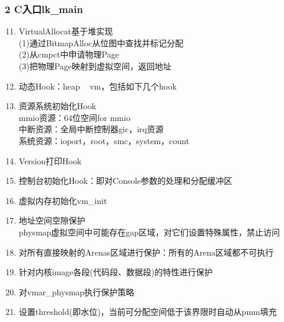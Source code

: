 \documentclass[
8pt, %
]{beamer}
\begin{document}
	\begin{frame}
		\frametitle{2 C入口lk\_main}
		\begin{enumerate}\setcounter{enumi}{10}
			\item VirtualAllocat基于堆实现\\
			(1)通过BitmapAlloc从位图中查找并标记分配\\
			(2)从cmpct中申请物理Page\\
			(3)把物理Page映射到虚拟空间，返回地址
			\item 动态Hook：heap ~ vm，包括如下几个hook
			\item 资源系统初始化Hook\\
			mmio资源：64位空间for mmio\\
			中断资源：全局中断控制器gic，irq资源\\
			系统资源：ioport，root，smc，system，count
			\item Version打印Hook
			\item 控制台初始化Hook：即对Console参数的处理和分配缓冲区
			\item 虚拟内存初始化vm\_init
			\item 地址空间空隙保护\\
			physmap虚拟空间中可能存在gap区域，对它们设置特殊属性，禁止访问
			\item 对所有直接映射的Arenas区域进行保护：所有的Arena区域都不可执行
			\item 针对内核image各段(代码段、数据段)的特性进行保护
			\item 对vmar\_physmap执行保护策略
			\item 设置threshold(即水位)，当前可分配空间低于该界限时自动从pmm填充
		\end{enumerate}
	\end{frame}
\end{document}
